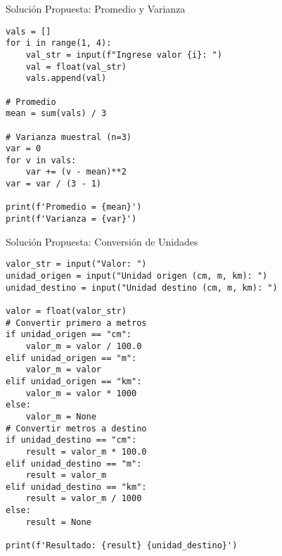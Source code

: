 \documentclass[10pt]{beamer}
\begin{document}
\begin{frame}[fragile]{Solución Propuesta: Promedio y Varianza}
\begin{verbatim}
vals = []
for i in range(1, 4):
    val_str = input(f"Ingrese valor {i}: ")
    val = float(val_str)
    vals.append(val)

# Promedio
mean = sum(vals) / 3

# Varianza muestral (n=3)
var = 0
for v in vals:
    var += (v - mean)**2
var = var / (3 - 1)

print(f'Promedio = {mean}')
print(f'Varianza = {var}')
\end{verbatim}
\end{frame}

\begin{frame}[fragile]{Solución Propuesta: Conversión de Unidades}
\begin{verbatim}
valor_str = input("Valor: ")
unidad_origen = input("Unidad origen (cm, m, km): ")
unidad_destino = input("Unidad destino (cm, m, km): ")

valor = float(valor_str)
# Convertir primero a metros
if unidad_origen == "cm":
    valor_m = valor / 100.0
elif unidad_origen == "m":
    valor_m = valor
elif unidad_origen == "km":
    valor_m = valor * 1000
else:
    valor_m = None
# Convertir metros a destino
if unidad_destino == "cm":
    result = valor_m * 100.0
elif unidad_destino == "m":
    result = valor_m
elif unidad_destino == "km":
    result = valor_m / 1000
else:
    result = None

print(f'Resultado: {result} {unidad_destino}')
\end{verbatim}
\end{frame}
\end{document}
